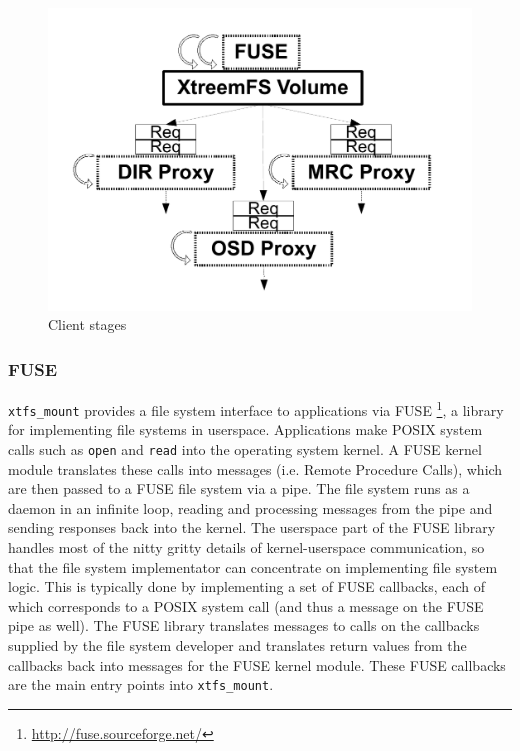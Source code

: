 \begin{figure}[htbp]
\centering
\includegraphics[width=.80\columnwidth]{images/xtreemfs_client_stages}
\caption{Client stages}
\label{xtreemfs_client/figures/xtreemfs_client_stages}
\end{figure}

\subsubsection{FUSE}

\texttt{xtfs\_mount} provides a file system interface to applications via FUSE \footnote{\url{http://fuse.sourceforge.net/}}, a library for implementing file systems in userspace. Applications make POSIX system calls such as \texttt{open} and \texttt{read} into the operating system kernel. A FUSE kernel module translates these calls into messages (i.e. Remote Procedure Calls), which are then passed to a FUSE file system via a pipe. The file system runs as a daemon in an infinite loop, reading and processing messages from the pipe and sending responses back into the kernel. The userspace part of the FUSE library handles most of the nitty gritty details of kernel-userspace communication, so that the file system implementator can concentrate on implementing file system logic. This is typically done by implementing a set of FUSE callbacks, each of which corresponds to a POSIX system call (and thus a message on the FUSE pipe as well). The FUSE library translates messages to calls on the callbacks supplied by the file system developer and translates return values from the callbacks back into messages for the FUSE kernel module. These FUSE callbacks are the main entry points into \texttt{xtfs\_mount}.

